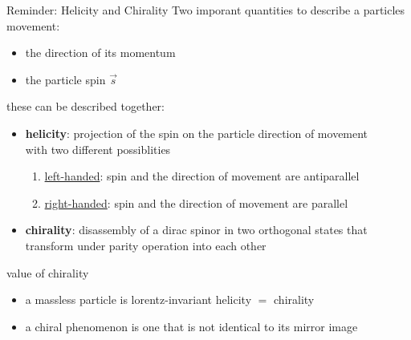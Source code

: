 \documentclass[aspectratio=1610, 10pt]{beamer}
\begin{document}
\begin{frame}{Reminder: Helicity and Chirality}
	Two imporant quantities to describe a particles movement:
	\begin{itemize}
		\item the direction of its momentum
		\item the particle spin $\vec{s}$
	\end{itemize}
	these can be described together:
	\begin{itemize}
		\item \textbf{helicity}: projection of the spin on the particle direction of movement\\
		\textrightarrow with two different possiblities
		\begin{enumerate}
			\item \underline{left-handed}: spin and the direction of movement are antiparallel
			\item \underline{right-handed}: spin and the direction of movement are parallel
		\end{enumerate}
		\item \textbf{chirality}: disassembly of a dirac spinor in two orthogonal states that transform under parity operation into each other
	\end{itemize}
	\begin{block}{value of chirality}
		\begin{itemize}
			\item a massless particle is lorentz-invariant \textrightarrow helicity $=$ chirality
			\item a chiral phenomenon is one that is not identical to its mirror image
		\end{itemize}
	\end{block}
\end{frame}
\end{document}
